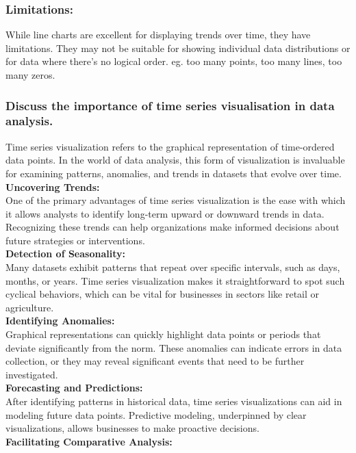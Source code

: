 \documentclass{article}\usepackage[]{graphicx}\usepackage[]{xcolor}
\begin{document}
\subsubsection{Limitations:}
While line charts are excellent for displaying trends over time, they have limitations. They may not be suitable for showing individual data distributions or for data where there's no logical order. eg. too many points, too many lines, too many zeros.\\


\subsubsection{Discuss the importance of time series visualisation in data analysis.}

Time series visualization refers to the graphical representation of time-ordered data points. In the world of data analysis, this form of visualization is invaluable for examining patterns, anomalies, and trends in datasets that evolve over time.\\
\textbf{Uncovering Trends:}\\
One of the primary advantages of time series visualization is the ease with which it allows analysts to identify long-term upward or downward trends in data. Recognizing these trends can help organizations make informed decisions about future strategies or interventions.\\
\textbf{Detection of Seasonality:}\\
Many datasets exhibit patterns that repeat over specific intervals, such as days, months, or years. Time series visualization makes it straightforward to spot such cyclical behaviors, which can be vital for businesses in sectors like retail or agriculture.\\
\textbf{Identifying Anomalies:}\\
Graphical representations can quickly highlight data points or periods that deviate significantly from the norm. These anomalies can indicate errors in data collection, or they may reveal significant events that need to be further investigated.\\
\textbf{Forecasting and Predictions:}\\
After identifying patterns in historical data, time series visualizations can aid in modeling future data points. Predictive modeling, underpinned by clear visualizations, allows businesses to make proactive decisions.\\
\textbf{Facilitating Comparative Analysis:}\\
\end{document}
